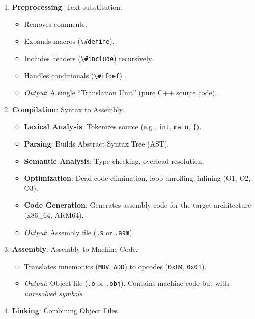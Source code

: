 \begin{enumerate}
\def\labelenumi{\arabic{enumi}.}
\tightlist
\item
  \textbf{Preprocessing}: Text substitution.

  \begin{itemize}
  \tightlist
  \item
    Removes comments.
  \item
    Expands macros (\passthrough{\lstinline!\#define!}).
  \item
    Includes headers (\passthrough{\lstinline!\#include!}) recursively.
  \item
    Handles conditionals (\passthrough{\lstinline!\#ifdef!}).
  \item
    \emph{Output}: A single ``Translation Unit'' (pure C++ source code).
  \end{itemize}
\item
  \textbf{Compilation}: Syntax to Assembly.

  \begin{itemize}
  \tightlist
  \item
    \textbf{Lexical Analysis}: Tokenizes source (e.g.,
    \passthrough{\lstinline!int!}, \passthrough{\lstinline!main!},
    \passthrough{\lstinline!\{!}).
  \item
    \textbf{Parsing}: Builds Abstract Syntax Tree (AST).
  \item
    \textbf{Semantic Analysis}: Type checking, overload resolution.
  \item
    \textbf{Optimization}: Dead code elimination, loop unrolling,
    inlining (O1, O2, O3).
  \item
    \textbf{Code Generation}: Generates assembly code for the target
    architecture (x86\_64, ARM64).
  \item
    \emph{Output}: Assembly file (\passthrough{\lstinline!.s!} or
    \passthrough{\lstinline!.asm!}).
  \end{itemize}
\item
  \textbf{Assembly}: Assembly to Machine Code.

  \begin{itemize}
  \tightlist
  \item
    Translates mnemonics (\passthrough{\lstinline!MOV!},
    \passthrough{\lstinline!ADD!}) to opcodes
    (\passthrough{\lstinline!0x89!}, \passthrough{\lstinline!0x01!}).
  \item
    \emph{Output}: Object file (\passthrough{\lstinline!.o!} or
    \passthrough{\lstinline!.obj!}). Contains machine code but with
    \emph{unresolved symbols}.
  \end{itemize}
\item
  \textbf{Linking}: Combining Object Files.


\end{enumerate}
